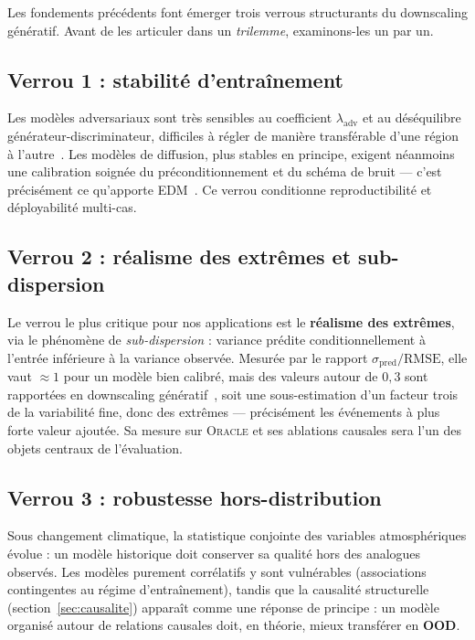 \documentclass[14pt,a4paper,openany]{extreport}
\newcommand{\Oracle}{\textsc{Oracle}}
\begin{document}
Les fondements précédents font émerger trois verrous structurants du downscaling génératif. Avant de les articuler dans un \emph{trilemme}, examinons-les un par un.

\subsection{Verrou 1 : stabilité d'entraînement}
\label{ssec:verrou-stabilite}

Les modèles adversariaux sont très sensibles au coefficient $\lambda_{\mathrm{adv}}$ et au déséquilibre générateur-discriminateur, difficiles à régler de manière transférable d'une région à l'autre~\cite{rampal_cgan_2024}. Les modèles de diffusion, plus stables en principe, exigent néanmoins une calibration soignée du préconditionnement et du schéma de bruit --- c'est précisément ce qu'apporte EDM~\cite{karras_edm_2022}. Ce verrou conditionne reproductibilité et déployabilité multi-cas.

\subsection{Verrou 2 : réalisme des extrêmes et sub-dispersion}
\label{ssec:verrou-extremes}

Le verrou le plus critique pour nos applications est le \textbf{réalisme des extrêmes}, via le phénomène de \emph{sub-dispersion} : variance prédite conditionnellement à l'entrée inférieure à la variance observée. Mesurée par le rapport $\sigma_{\mathrm{pred}} / \mathrm{RMSE}$, elle vaut $\approx 1$ pour un modèle bien calibré, mais des valeurs autour de $0{,}3$ sont rapportées en downscaling génératif~\cite{rampal_cgan_2024,mardani_corrdiff_2023,harris_2022}, soit une sous-estimation d'un facteur trois de la variabilité fine, donc des extrêmes --- précisément les événements à plus forte valeur ajoutée. Sa mesure sur \Oracle{} et ses ablations causales sera l'un des objets centraux de l'évaluation.

\subsection{Verrou 3 : robustesse hors-distribution}
\label{ssec:verrou-ood}

Sous changement climatique, la statistique conjointe des variables atmosphériques évolue : un modèle historique doit conserver sa qualité hors des analogues observés. Les modèles purement corrélatifs y sont vulnérables (associations contingentes au régime d'entraînement), tandis que la causalité structurelle (section~\ref{sec:causalite}) apparaît comme une réponse de principe : un modèle organisé autour de relations causales doit, en théorie, mieux transférer en \textbf{OOD}.
\end{document}
